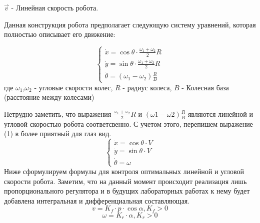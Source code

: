 \documentclass[12pt,a4paper,openany]{extarticle}
\begin{document}
$\vec{v}$ - Линейная скорость робота.

Данная конструкция робота предполагает следующую систему уравнений, которая полностью описывает его движение:

\begin{equation}
 \begin{cases}
	\dot{x} = \cos{\theta} \cdot \frac{\omega_1 + \omega_2}{2}R\\
	\dot{y} = \sin{\theta} \cdot \frac{\omega_1 + \omega_2}{2}R\\
	\dot{\theta} = (\omega_1 - \omega_2)\frac{R}{B}
 \end{cases}
\end{equation}
где $\omega_1$,$\omega_2$ - угловые скорости колес, $R$ - радиус колеса, $B$ - Колесная база (расстояние между колесами)

Нетрудно заметить, что выражения $\frac{\omega_1+\omega_2}{2}R$ и $(\omega1-\omega2)\frac{R}{B}$ являются линейной и угловой скоростью робота соответсвенно. С учетом этого, перепишем выражение (1) в более приятный для глаз вид.
\begin{equation}
 \begin{cases}
	\dot{x} = \cos{\theta} \cdot V\\
	\dot{y} = \sin{\theta} \cdot V\\
	\dot{\theta} = \omega
 \end{cases}
\end{equation}
Ниже сформулируем формулы для контроля оптимальных линейной и угловой скорости робота. Заметим, что на данный момент происходит реализация лишь пропорционального регулятора и в будущих лабораторных работах к нему будет добавлена интегральная и дифференциальная составляющая.
\begin{equation}
 v = K_f \cdot p \cdot \cos{\alpha}, K_f > 0
\end{equation}
\begin{equation}
 \omega = K_r \cdot \alpha, K_r > 0
\end{equation}	
\end{document}
